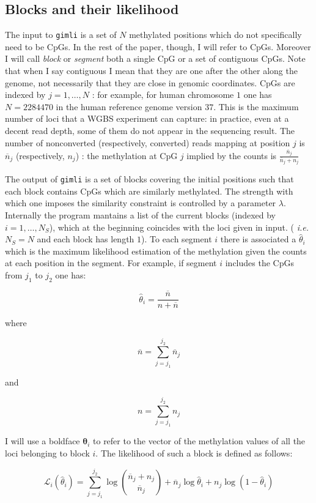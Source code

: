 \documentclass[12pt]{amsart}
\newcommand{\lik}{\ensuremath{\mathcal{L}}}
\newcommand{\gimli}{\texttt{gimli}}
\newcommand{\ie}{\textit{i.e.}}
\begin{document}
\subsection{Blocks and their likelihood}
The  input to \gimli{} is a set of $N$ methylated positions 
which do not specifically need to be CpGs.
In the rest of the paper, though, I will refer to CpGs. Moreover 
I will call {\em block} or {\em segment} 
both a single CpG or a set of contiguous CpGs. 
Note that when I say contiguous I mean that they are one
after the other along the genome, not necessarily that they are
close in genomic coordinates. CpGs are 
indexed by $j=1,\dots,N$ : for example, for human chromosome $1$ 
one has $N = 2284470$ in the human reference genome version $37$.
This is the maximum number of loci that a WGBS experiment can capture: 
in practice, even at a decent read depth,
some of them do not appear in the sequencing result. 
The number of nonconverted (respectively, converted) reads mapping at 
position $j$ is $\overline{n}_j$ (respectively, $n_j$) : the methylation
at CpG $j$ implied by the counts is $\frac{\overline{n}_j}{\overline{n}_j+n_j}$

The output of \gimli{} is a set of blocks 
covering the initial positions 
such that each block contains CpGs which are similarly
methylated. The strength with which
one imposes the similarity constraint
is controlled by a parameter $\lambda$.
Internally the program  mantains a list of the current  
blocks (indexed by $i=1,\dots,N_S$), 
which at the beginning 
coincides with the loci given in input. 
( \ie{}  $N_S=N$ and each block has length $1$). 
To each segment $i$ there is associated a $\hat{\theta}_i$ which
is the maximum likelihood estimation of the methylation given the counts
at each position in the segment. 
For example, if segment $i$ includes the CpGs from $j_1$ to $j_2$
one has:

\[
\hat{\theta}_i=\frac{\overline{n}}{n + \overline{n}}
\]

where

\[
\overline{n}=\sum_{j=j_1}^{j_2} \overline{n}_j
\]

and

\[
n=\sum_{j=j_1}^{j_2} n_j
\]

I will use a boldface
$\pmb{\theta}_i$ to refer to the vector of the methylation values of all the loci belonging to 
block $i$.  
The likelihood of such a block is defined as follows:

\begin{equation}
\lik_i(\hat{\theta}_i)=\sum_{j=j_1}^{j_2} 
\log {\overline{n}_j+n_j \choose \overline{n}_j} +
	{\overline{n}_j}\log\hat{\theta}_i+
	n_j\log(1-\hat{\theta}_i)
\end{equation}
\label{loglik}
\end{document}
